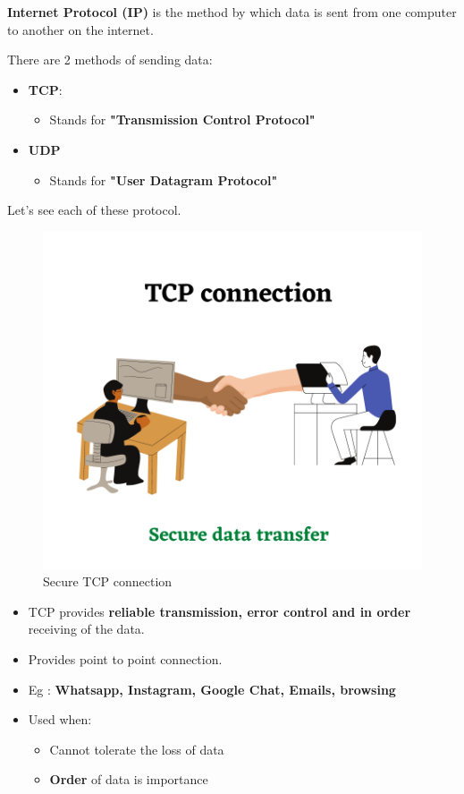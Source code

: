 \setlength{\columnsep}{3pt}
\begin{flushleft}
	
	\textbf{Internet Protocol (IP)} is the method by which data is sent from one computer to another on the internet.
	
	There are 2 methods of sending data:
	\begin{itemize}
		\item \textbf{TCP}:
		\begin{itemize}
			\item Stands for \textbf{"Transmission Control Protocol"}
		\end{itemize}
		\item \textbf{UDP}
		\begin{itemize}
			\item Stands for \textbf{"User Datagram Protocol"}
		\end{itemize}
	\end{itemize}

	Let's see each of these protocol.
	\newpage
	
	\begin{figure}[h!]
		\centering
		\includegraphics[scale=0.6]{content/chapter14/images/tcp.png}
		\caption{Secure TCP connection}
		\label{fig:tcp}
	\end{figure}

	\begin{itemize}
		\item TCP provides \textbf{reliable transmission, error control and in order} receiving of the data.
		\item Provides point to point connection.
		\item Eg : \textbf{Whatsapp, Instagram, Google Chat, Emails, browsing}
		\item Used when:
		\begin{itemize}
			\item Cannot tolerate the loss of data
			\item \textbf{Order} of data is importance
		\end{itemize}
	\end{itemize}
	

\end{flushleft}
